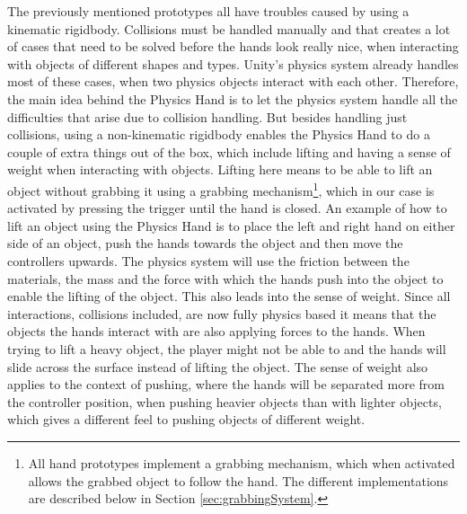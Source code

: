 The previously mentioned prototypes all have troubles caused by using a kinematic rigidbody. Collisions must be handled manually and that creates a lot of cases that need to be solved before the hands look really nice, when interacting with objects of different shapes and types. Unity's physics system already handles most of these cases, when two physics objects interact with each other. Therefore, the main idea behind the Physics Hand is to let the physics system handle all the difficulties that arise due to collision handling. But besides handling just collisions, using a non-kinematic rigidbody enables the Physics Hand to do a couple of extra things out of the box, which include lifting and having a sense of weight when interacting with objects. Lifting here means to be able to lift an object without grabbing it using a grabbing mechanism\footnote{All hand prototypes implement a grabbing mechanism, which when activated allows the grabbed object to follow the hand. The different implementations are described below in Section \ref{sec:grabbingSystem}.}, which in our case is activated by pressing the trigger until the hand is closed. An example of how to lift an object using the Physics Hand is to place the left and right hand on either side of an object, push the hands towards the object and then move the controllers upwards. The physics system will use the friction between the materials, the mass and the force with which the hands push into the object to enable the lifting of the object. This also leads into the sense of weight. Since all interactions, collisions included, are now fully physics based it means that the objects the hands interact with are also applying forces to the hands. When trying to lift a heavy object, the player might not be able to and the hands will slide across the surface instead of lifting the object. The sense of weight also applies to the context of pushing, where the hands will be separated more from the controller position, when pushing heavier objects than with lighter objects, which gives a different feel to pushing objects of different weight.

